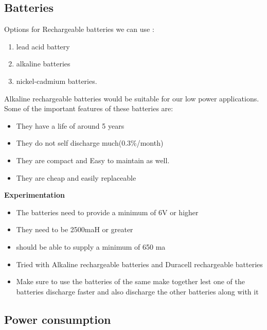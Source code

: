 \documentclass[16pt]{article}
\begin{document}
\hfill

\subsection{Batteries}

\hfill

Options for Rechargeable batteries we can use :
\hfill
\begin{enumerate}

\item
  lead acid battery
\item
  alkaline batteries
\item
  nickel-cadmium batteries.
\end{enumerate}

\hfill


Alkaline rechargeable batteries would be suitable for our low power
applications. Some of the important features of these batteries are:
\hfill
\begin{itemize}

\item
  They have a life of around 5 years
\item
  They do not self discharge much(0.3\%/month)
\item
  They are compact and Easy to maintain as well.
\item
  They are cheap and easily replaceable
\end{itemize}

\hfill

{\Large{\textbf{Experimentation}}}

\begin{itemize}

\item
  The batteries need to provide a minimum of 6V or higher
\item
  They need to be 2500maH or greater
\item
  should be able to supply a minimum of 650 ma
\item
  Tried with Alkaline rechargeable batteries and Duracell rechargeable
  batteries
\item
  Make sure to use the batteries of the same make together lest one of
  the batteries discharge faster and also discharge the other batteries
  along with it
\end{itemize}

\hfill

\subsection{Power consumption}
\end{document}
